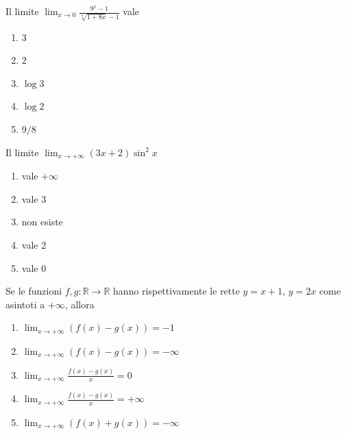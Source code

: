 \begin{quiz}
Il limite $\displaystyle\lim_{x\to0}\frac{9^x-1}{\sqrt[4]{1+8x}-1}$ vale
\begin{enumerate}
\item $3$
\item $2$
\item $\log3$
\item $\log2$
\item $9/8$
\end{enumerate}
\end{quiz}

\begin{quiz}
Il limite $\displaystyle\lim_{x\to+\infty}(3x+2)\sin^2x$
\begin{enumerate}
\item vale $+\infty$
\item vale $3$
\item non esiste
\item vale $2$
\item vale $0$
\end{enumerate}
\end{quiz}

\begin{quiz}
Se le funzioni $f,g:\mathbb R\to\mathbb R$ hanno rispettivamente le rette $y=x+1$, $y=2x$ come asintoti a $+\infty$, allora
\begin{enumerate}
\item $\lim_{x\to+\infty}(f(x)-g(x))=-1$
\item $\lim_{x\to+\infty}(f(x)-g(x))=-\infty$
\item $\lim_{x\to+\infty}\frac{f(x)-g(x)}{x}=0$
\item $\lim_{x\to+\infty}\frac{f(x)-g(x)}{x}=+\infty$
\item $\lim_{x\to+\infty}(f(x)+g(x))=-\infty$
\end{enumerate}
\end{quiz}

